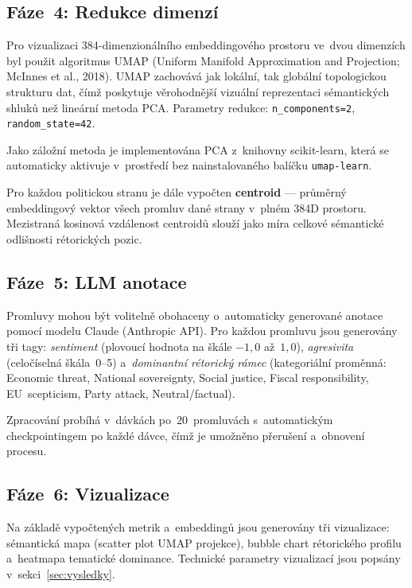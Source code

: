 \documentclass[12pt, a4paper]{article}
\begin{document}
\subsection{Fáze~4: Redukce dimenzí}
\label{sec:umap}

Pro vizualizaci 384-dimenzionálního embeddingového prostoru ve~dvou dimenzích
byl použit algoritmus UMAP (Uniform Manifold Approximation and Projection;
McInnes et al., 2018). UMAP zachovává jak lokální, tak globální topologickou
strukturu dat, čímž poskytuje věrohodnější vizuální reprezentaci sémantických
shluků než lineární metoda PCA. Parametry redukce: \texttt{n\_components=2},
\texttt{random\_state=42}.

Jako záložní metoda je implementována PCA z~knihovny scikit-learn, která se
automaticky aktivuje v~prostředí bez nainstalovaného balíčku
\texttt{umap-learn}.

Pro každou politickou stranu je dále vypočten \textbf{centroid} — průměrný
embeddingový vektor všech promluv dané strany v~plném 384D prostoru.
Mezistraná kosinová vzdálenost centroidů slouží jako míra celkové sémantické
odlišnosti rétorických pozic.

\subsection{Fáze~5: LLM anotace}
\label{sec:enrichment}

Promluvy mohou být volitelně obohaceny o~automaticky generované anotace
pomocí modelu Claude (Anthropic API). Pro každou promluvu jsou generovány
tři tagy: \textit{sentiment} (plovoucí hodnota na škále $-1{,}0$ až~$1{,}0$),
\textit{agresivita} (celočíselná škála~0--5) a~\textit{dominantní rétorický
rámec} (kategoriální proměnná: Economic threat, National sovereignty,
Social justice, Fiscal responsibility, EU~scepticism, Party attack,
Neutral/factual).

Zpracování probíhá v~dávkách po~20~promluvách s~automatickým checkpointingem
po každé dávce, čímž je umožněno přerušení a~obnovení procesu.

\subsection{Fáze~6: Vizualizace}
\label{sec:viz}

Na základě vypočtených metrik a~embeddingů jsou generovány tři vizualizace:
sémantická mapa (scatter plot UMAP projekce), bubble chart rétorického
profilu a~heatmapa tematické dominance. Technické parametry vizualizací
jsou popsány v~sekci~\ref{sec:vysledky}.
\end{document}
